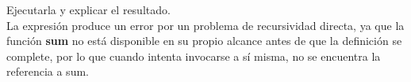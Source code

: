 Ejecutarla y explicar el resultado.\\
La expresión produce un error por un problema de recursividad directa, ya que la función \textbf{sum} no está disponible en su propio alcance antes de que la definición se complete, por lo que cuando intenta invocarse a sí misma, no se encuentra la referencia a sum.